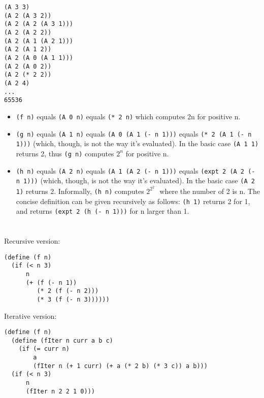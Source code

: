 \documentclass[a4paper]{report}
\begin{document}
\begin{lstlisting}
(A 3 3)
(A 2 (A 3 2))
(A 2 (A 2 (A 3 1)))
(A 2 (A 2 2))
(A 2 (A 1 (A 2 1)))
(A 2 (A 1 2))
(A 2 (A 0 (A 1 1)))
(A 2 (A 0 2))
(A 2 (* 2 2))
(A 2 4)
...
65536
\end{lstlisting}

\begin{itemize}
\item \lstinline{(f n)} equals \lstinline{(A 0 n)} equals \lstinline{(* 2 n)} which computes 2n for positive n.
\item \lstinline{(g n)} equals \lstinline{(A 1 n)} equals \lstinline{(A 0 (A 1 (- n 1)))} equals \lstinline{(* 2 (A 1 (- n 1)))} (which, though, is not the way it's evaluated). In the basic case \lstinline{(A 1 1)} returns 2, thus \lstinline{(g n)} computes $2^n$ for positive n.
\item \lstinline{(h n)} equals \lstinline{(A 2 n)} equals \lstinline{(A 1 (A 2 (- n 1)))} equals \lstinline{(expt 2 (A 2 (- n 1)))} (which, though, is not the way it's evaluated). In the basic case \lstinline{(A 2 1)} returns 2. Informally, \lstinline{(h n)} computes $2^{2^{2^{...}}}$ where the number of 2 is n. The concise definition can be given recursively as follows: \lstinline{(h 1)} returns 2 for 1, and returns \lstinline{(expt 2 (h (- n 1)))} for n larger than 1.
\end{itemize}


\section{}

Recursive version:

\begin{lstlisting}
(define (f n)
  (if (< n 3)
      n
      (+ (f (- n 1))
         (* 2 (f (- n 2)))
         (* 3 (f (- n 3))))))
\end{lstlisting}

Iterative version:

\begin{lstlisting}
(define (f n)
  (define (fIter n curr a b c)
    (if (= curr n)
        a
        (fIter n (+ 1 curr) (+ a (* 2 b) (* 3 c)) a b)))
  (if (< n 3)
      n
      (fIter n 2 2 1 0)))
\end{lstlisting}


\section{}
\end{document}
